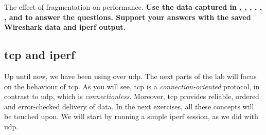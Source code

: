 \begin{exercise}{The effect of fragmentation on performance.}
\textbf{Use the data captured in , , , , , ,  and  to answer the questions. Support your answers with the saved Wireshark data and iperf output.}

\end{exercise}

\newpage
\subsection{\ac{tcp} and iperf}
Up until now, we have been using  over \ac{udp}. The next parts of the lab will focus on the behaviour of \ac{tcp}. As you will see, \ac{tcp} is a \emph{connection-oriented} protocol, in contrast to \ac{udp}, which is \emph{connectionless}. Moreover, \ac{tcp} provides reliable, ordered and error-checked delivery of data. In the next exercises, all these concepts will be touched upon. We will start by running a simple iperf session, as we did with \ac{udp}.

